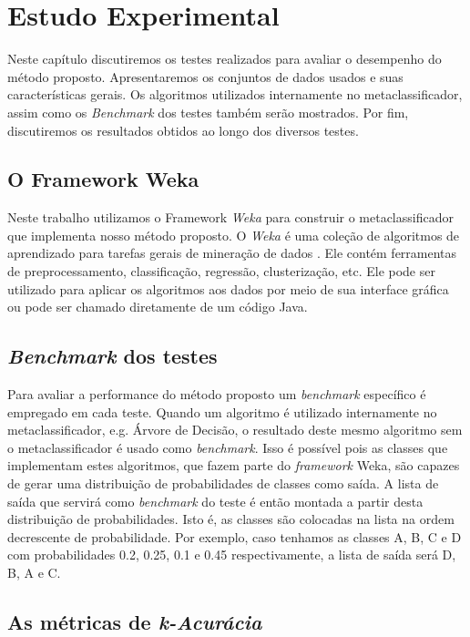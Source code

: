 \chapter{Estudo Experimental}
\label{chap:descricaodostestes}

Neste capítulo discutiremos os testes realizados para avaliar o desempenho do método proposto.
Apresentaremos os conjuntos de dados usados e suas características gerais. 
Os algoritmos utilizados internamente no metaclassificador, assim como os \textit{Benchmark} dos testes também serão mostrados.
Por fim, discutiremos os resultados obtidos ao longo dos diversos testes.

\section{O Framework Weka}

Neste trabalho utilizamos o Framework \textit{Weka} para construir o metaclassificador que implementa nosso método proposto. 
O \textit{Weka} é uma coleção de algoritmos de aprendizado para tarefas gerais de mineração de dados \cite{Hall}.
Ele contém ferramentas de preprocessamento, classificação, regressão, clusterização, etc.
Ele pode ser utilizado para aplicar os algoritmos aos dados por meio de sua interface gráfica ou pode ser chamado diretamente de um código Java.

\section{\textit{Benchmark} dos testes}

Para avaliar a performance do método proposto um \textit{benchmark} específico é empregado em cada teste.
Quando um algoritmo é utilizado internamente no metaclassificador, e.g. Árvore de Decisão, o resultado deste mesmo algoritmo sem o metaclassificador é usado como \textit{benchmark}.
Isso é possível pois as classes que implementam estes algoritmos, que fazem parte do \textit{framework} Weka, são capazes de gerar uma distribuição de probabilidades de classes como saída.
A lista de saída que servirá como \textit{benchmark} do teste é então montada a partir desta distribuição de probabilidades.
Isto é, as classes são colocadas na lista na ordem decrescente de probabilidade.
Por exemplo, caso tenhamos as classes A, B, C e D com probabilidades 0.2, 0.25, 0.1 e 0.45 respectivamente, a lista de saída será D, B, A e C.

\section{As métricas de \textit{k-Acurácia}}

